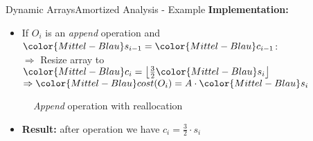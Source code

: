 
\begin{frame}{Dynamic Arrays}{Amortized Analysis - Example}
  \textbf{Implementation:}
  \begin{itemize}
    \item
      If {\color{Mittel-Blau}$O_i$} is an \textit{append} operation and
      ${\color{Mittel-Blau}s_{i-1}} = {\color{Mittel-Blau}c_{i-1}}$:\\
      $\Rightarrow$ Resize array to
      ${\color{Mittel-Blau}c_i}
        = \left\lfloor\frac{3}{2} {\color{Mittel-Blau}s_i} \right\rfloor$\\
      $\Rightarrow {\color{Mittel-Blau}cost(O_i)}
        = A \cdot {\color{Mittel-Blau}s_i}$
  \end{itemize}
  \begin{figure}[!h]
    \def\FSAsize{7}\def\FSAelements{7}%
    \def\FSAcopy{0}\def\FSAdelete{0}\def\FSAinsert{0}%
    \def\FSAcopyarrow{0}%
    \def\FSAlabelsize{${\color{Mittel-Blau}s_{i-1}} = 7$}%
    \def\FSAlabelcapacity{%
      ${\color{Mittel-Blau}c_{i-1}}%
        = {\color{Mittel-Blau}s_{i-1}} = 7$}%
    \hspace*{0.5em}\raisebox{2em}{$\Rightarrow$}\hspace*{0.5em}%
    \def\FSAsize{12}\def\FSAelements{0}%
    \def\FSAcopy{7}\def\FSAdelete{0}\def\FSAinsert{1}%
    \def\FSAlabelsize{${\color{Mittel-Blau}s_i}
      = {\color{Mittel-Blau}s_{i-1} + 1}=8$}%
    \def\FSAlabelcapacity{$12={\color{Mittel-Blau}c_i}
      = \lfloor\frac{3}{2}{\color{Mittel-Blau}s_i}\rfloor = 8$}%
    \caption{\textit{Append} operation with reallocation}
    \label{fig:dynamic_fields:amortized_analysis:append}
  \end{figure}
\begin{itemize}
  \item[] \textbf{Result:} after operation we have $c_i=\frac{3}{2}\cdot s_i$
  \end{itemize}
\end{frame}


